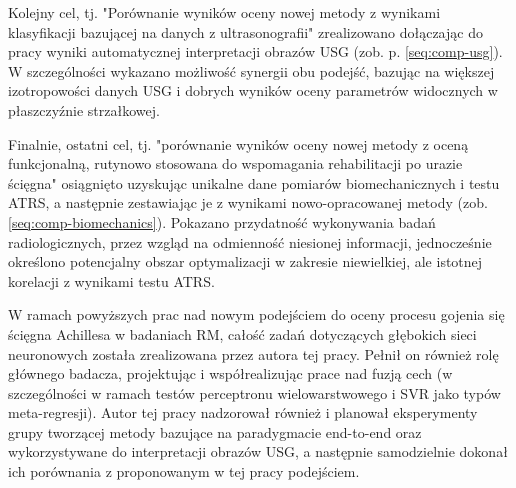 Kolejny cel, tj. "Porównanie wyników oceny nowej metody z wynikami klasyfikacji bazującej na danych z ultrasonografii" zrealizowano dołączając do pracy wyniki automatycznej interpretacji obrazów USG (zob. p. \ref{seq:comp-usg}). W szczególności wykazano możliwość synergii obu podejść, bazując na większej izotropowości danych USG i dobrych wyników oceny parametrów widocznych w płaszczyźnie strzałkowej.

Finalnie, ostatni cel, tj. "porównanie wyników oceny nowej metody z oceną funkcjonalną, rutynowo stosowana do wspomagania rehabilitacji po urazie ścięgna" osiągnięto uzyskując unikalne dane pomiarów biomechanicznych i testu ATRS, a następnie zestawiając je z wynikami nowo-opracowanej metody (zob. \ref{seq:comp-biomechanics}). Pokazano przydatność wykonywania badań radiologicznych, przez wzgląd na odmienność niesionej informacji, jednocześnie określono potencjalny obszar optymalizacji w zakresie niewielkiej, ale istotnej korelacji z wynikami testu ATRS.  

W ramach powyższych prac nad nowym podejściem do oceny procesu gojenia się ścięgna Achillesa w badaniach RM, całość zadań dotyczących głębokich sieci neuronowych została zrealizowana przez autora tej pracy. Pełnił on również rolę głównego badacza, projektując i współrealizując prace nad fuzją cech (w szczególności w ramach testów perceptronu wielowarstwowego i SVR jako typów meta-regresji). Autor tej pracy nadzorował również i planował eksperymenty grupy tworzącej metody bazujące na paradygmacie end-to-end oraz wykorzystywane do interpretacji obrazów USG, a następnie samodzielnie dokonał ich porównania z proponowanym w tej pracy podejściem. 

